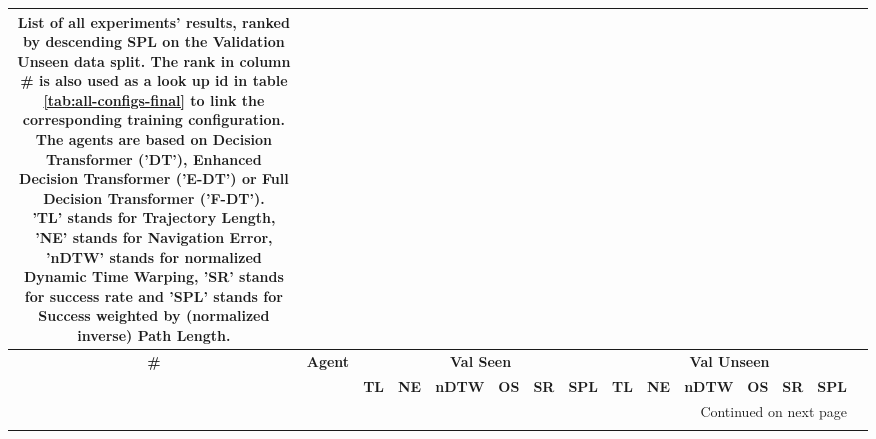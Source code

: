 \begin{longtable}{@{\hskip3pt}c@{\hskip3pt}c@{\hskip3pt}c@{\hskip3pt}c@{\hskip3pt}c@{\hskip3pt}c@{\hskip3pt}c@{\hskip3pt}c@{\hskip3pt}c@{\hskip3pt}c@{\hskip3pt}c@{\hskip3pt}c@{\hskip3pt}c@{\hskip3pt}c@{\hskip3pt}c}
\caption{List of all experiments' results, ranked by descending SPL on the Validation Unseen data split. The rank in column \# is also used as a look up id in table \ref{tab:all-configs-final} to link the corresponding training configuration. \newline The agents are based on Decision Transformer ('DT'), Enhanced Decision Transformer ('E-DT') or Full Decision Transformer ('F-DT').\newline 'TL' stands for Trajectory Length, 'NE' stands for Navigation Error, 'nDTW' stands for normalized Dynamic Time Warping, 'SR' stands for success rate and 'SPL' stands for  Success weighted by (normalized inverse) Path Length.}\\
\toprule
\textbf{\#} & \textbf{Agent} & \multicolumn{6}{c}{\textbf{Val Seen}} & \multicolumn{6}{c}{\textbf{Val Unseen}} \\
\cmidrule(l){3-8} \cmidrule(l){9-14} \textbf{~} &     \textbf{~} &       \textbf{TL} &    \textbf{NE} &   \textbf{nDTW} &     \textbf{OS} &     \textbf{SR} &    \textbf{SPL} &         \textbf{TL} &     \textbf{NE} &   \textbf{nDTW} &   \textbf{OS} &    \textbf{SR} &    \textbf{SPL} \\
\midrule
\endhead
\midrule
\multicolumn{14}{r}{{Continued on next page}} \\
\midrule
\endfoot


\end{longtable}
